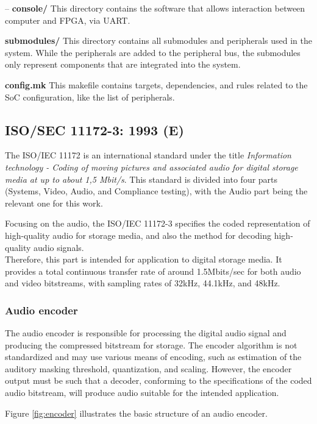 \hspace{0.5cm}– \textbf{console/} This directory contains the software that allows interaction between computer and FPGA, via UART.

\textbf{submodules/} This directory contains all submodules and peripherals used in the system. While the peripherals are added to the peripheral bus, the submodules only represent components that are integrated into the system. 

\textbf{config.mk} This makefile contains targets, dependencies, and rules related to the SoC configuration, like the list of peripherals.

\subsection{ISO/SEC 11172-3: 1993 (E)}

The ISO/IEC 11172 is an international standard under the title \textit{Information technology - Coding of moving pictures and associated audio for digital storage media at up to about 1,5 Mbit/s}. This standard is divided into four parts (Systems, Video, Audio, and Compliance testing), with the Audio part being the relevant one for this work.

Focusing on the audio, the ISO/IEC 11172-3 specifies the coded representation of high-quality audio for storage media, and also the method for decoding high-quality audio signals. \\
Therefore, this part is intended for application to digital storage media. It provides a total continuous transfer rate of around 1.5Mbits/sec for both audio and video bitstreams, with sampling rates of 32kHz, 44.1kHz, and 48kHz.

\subsubsection{Audio encoder}

The audio encoder is responsible for processing the digital audio signal and producing the compressed bitstream for storage. 
The encoder algorithm is not standardized and may use various means of encoding, such as estimation of the auditory masking threshold, quantization, and scaling. However, the encoder output must be such that a decoder, conforming to the specifications of the coded audio bitstream, will produce audio suitable for the intended application.

Figure \ref{fig:encoder} illustrates the basic structure of an audio encoder. 

